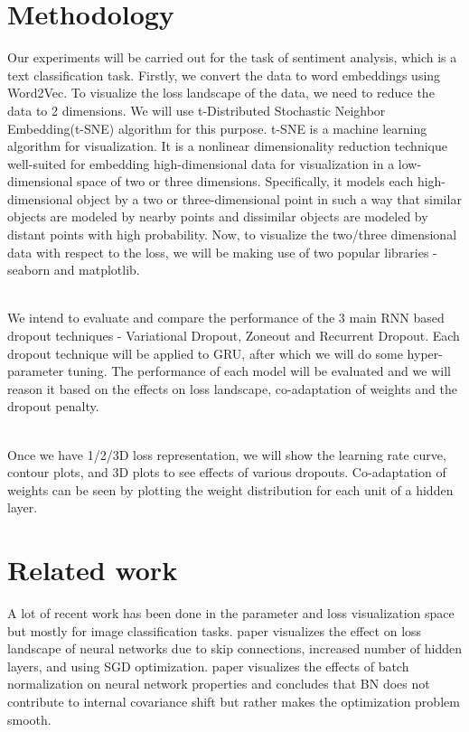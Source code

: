\documentclass[11pt,a4paper]{article}
\begin{document}
\section{Methodology}
Our experiments will be carried out for the task of sentiment analysis, which is a text classification task. Firstly, we convert the data to word embeddings using Word2Vec. To visualize the loss landscape of the data, we need to reduce the data to 2 dimensions. We will use t-Distributed Stochastic Neighbor Embedding(t-SNE) algorithm for this purpose. t-SNE is a machine learning algorithm for visualization. It is a nonlinear dimensionality reduction technique well-suited for embedding high-dimensional data for visualization in a low-dimensional space of two or three dimensions. Specifically, it models each high-dimensional object by a two or three-dimensional point in such a way that similar objects are modeled by nearby points and dissimilar objects are modeled by distant points with high probability. Now, to visualize the two/three dimensional data with respect to the loss, we will be making use of two popular libraries - seaborn and matplotlib.

\\We intend to evaluate and compare the performance of the 3 main RNN based dropout techniques - Variational Dropout, Zoneout  and Recurrent Dropout. Each dropout technique will be applied to GRU, after which we will do some hyper-parameter tuning. The performance of each model will be evaluated and we will reason it based on the effects on loss landscape, co-adaptation of weights and the dropout penalty.

\\Once we have 1/2/3D loss representation, we will show the learning rate curve, contour plots, and 3D plots to see effects of various dropouts. Co-adaptation of weights can be seen by plotting the weight distribution for each unit of a hidden layer.
\\


\section{Related work}
A lot of recent work has been done in the parameter and loss visualization space but mostly for image classification tasks. \cite{li2018visualizing} paper visualizes the effect on loss landscape of neural networks due to skip connections, increased number of hidden layers, and using SGD optimization. \cite{NIPS2018_7515} paper visualizes the effects of batch normalization on neural network properties and concludes that BN does not contribute to internal covariance shift but rather makes the optimization problem smooth.
\end{document}

